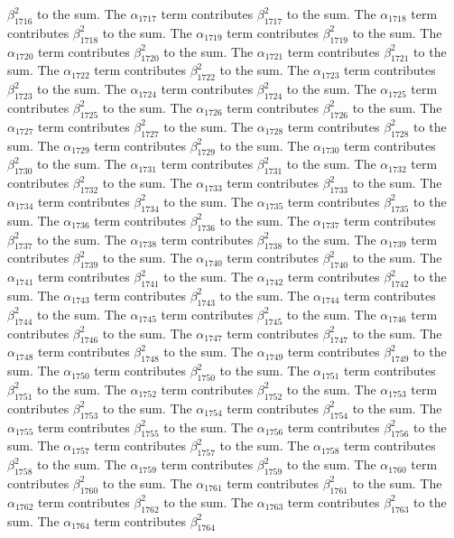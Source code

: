 \begin{lemma}
$\beta_{1716}^{2}$ to the sum. The $\alpha_{1717}$ term contributes $\beta_{1717}^{2}$ to the sum. The $\alpha_{1718}$ term contributes $\beta_{1718}^{2}$ to the sum. The $\alpha_{1719}$ term contributes $\beta_{1719}^{2}$ to the sum. The $\alpha_{1720}$ term contributes $\beta_{1720}^{2}$ to the sum. The $\alpha_{1721}$ term contributes $\beta_{1721}^{2}$ to the sum. The $\alpha_{1722}$ term contributes $\beta_{1722}^{2}$ to the sum. The $\alpha_{1723}$ term contributes $\beta_{1723}^{2}$ to the sum. The $\alpha_{1724}$ term contributes $\beta_{1724}^{2}$ to the sum. The $\alpha_{1725}$ term contributes $\beta_{1725}^{2}$ to the sum. The $\alpha_{1726}$ term contributes $\beta_{1726}^{2}$ to the sum. The $\alpha_{1727}$ term contributes $\beta_{1727}^{2}$ to the sum. The $\alpha_{1728}$ term contributes $\beta_{1728}^{2}$ to the sum. The $\alpha_{1729}$ term contributes $\beta_{1729}^{2}$ to the sum. The $\alpha_{1730}$ term contributes $\beta_{1730}^{2}$ to the sum. The $\alpha_{1731}$ term contributes $\beta_{1731}^{2}$ to the sum. The $\alpha_{1732}$ term contributes $\beta_{1732}^{2}$ to the sum. The $\alpha_{1733}$ term contributes $\beta_{1733}^{2}$ to the sum. The $\alpha_{1734}$ term contributes $\beta_{1734}^{2}$ to the sum. The $\alpha_{1735}$ term contributes $\beta_{1735}^{2}$ to the sum. The $\alpha_{1736}$ term contributes $\beta_{1736}^{2}$ to the sum. The $\alpha_{1737}$ term contributes $\beta_{1737}^{2}$ to the sum. The $\alpha_{1738}$ term contributes $\beta_{1738}^{2}$ to the sum. The $\alpha_{1739}$ term contributes $\beta_{1739}^{2}$ to the sum. The $\alpha_{1740}$ term contributes $\beta_{1740}^{2}$ to the sum. The $\alpha_{1741}$ term contributes $\beta_{1741}^{2}$ to the sum. The $\alpha_{1742}$ term contributes $\beta_{1742}^{2}$ to the sum. The $\alpha_{1743}$ term contributes $\beta_{1743}^{2}$ to the sum. The $\alpha_{1744}$ term contributes $\beta_{1744}^{2}$ to the sum. The $\alpha_{1745}$ term contributes $\beta_{1745}^{2}$ to the sum. The $\alpha_{1746}$ term contributes $\beta_{1746}^{2}$ to the sum. The $\alpha_{1747}$ term contributes $\beta_{1747}^{2}$ to the sum. The $\alpha_{1748}$ term contributes $\beta_{1748}^{2}$ to the sum. The $\alpha_{1749}$ term contributes $\beta_{1749}^{2}$ to the sum. The $\alpha_{1750}$ term contributes $\beta_{1750}^{2}$ to the sum. The $\alpha_{1751}$ term contributes $\beta_{1751}^{2}$ to the sum. The $\alpha_{1752}$ term contributes $\beta_{1752}^{2}$ to the sum. The $\alpha_{1753}$ term contributes $\beta_{1753}^{2}$ to the sum. The $\alpha_{1754}$ term contributes $\beta_{1754}^{2}$ to the sum. The $\alpha_{1755}$ term contributes $\beta_{1755}^{2}$ to the sum. The $\alpha_{1756}$ term contributes $\beta_{1756}^{2}$ to the sum. The $\alpha_{1757}$ term contributes $\beta_{1757}^{2}$ to the sum. The $\alpha_{1758}$ term contributes $\beta_{1758}^{2}$ to the sum. The $\alpha_{1759}$ term contributes $\beta_{1759}^{2}$ to the sum. The $\alpha_{1760}$ term contributes $\beta_{1760}^{2}$ to the sum. The $\alpha_{1761}$ term contributes $\beta_{1761}^{2}$ to the sum. The $\alpha_{1762}$ term contributes $\beta_{1762}^{2}$ to the sum. The $\alpha_{1763}$ term contributes $\beta_{1763}^{2}$ to the sum. The $\alpha_{1764}$ term contributes $\beta_{1764}^{2}$ 
\end{lemma}
